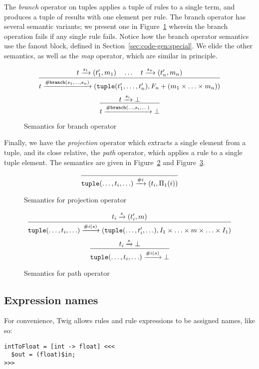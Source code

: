 The \emph{branch} operator on tuples applies a tuple of rules to a single term, and produces a tuple of results with one element per rule. The branch operator has several semantic variants; we present one in Figure~\ref{fig:branch} wherein the branch operation fails if any single rule fails. Notice how the branch operator semantics use the fanout block, defined in Section~\ref{sec:code-gen:special}. We elide the other semantics, as well as the \emph{map} operator, which are similar in principle.

\begin{figure}[ht]
\label{fig:branch}
\[
\infer
  {t \arr{\mathtt{\#branch}(s_1,\ldots,s_n)} (\mathtt{tuple}(t_1',\ldots,t_n'),F_n + (m_1 \times \ldots \times m_n))}
  {t \arr{s_1} (t_1',m_1) \quad \ldots \quad t \arr{s_n} (t_n',m_n)}
\]
\[
\infer
  {t \arr{\mathtt{\#branch}(\ldots,s_i,\dots)} \bot}
  {t \arr{s_i} \bot}
\]
\caption{Semantics for branch operator}
\end{figure}

Finally, we have the \emph{projection} operator which extracts a single element from a tuple, and its close relative, the \emph{path} operator, which applies a rule to a single tuple element. The semantics are given in Figure~\ref{fig:projection} and Figure~\ref{fig:path}.

\begin{figure}[ht]
\label{fig:projection}
\[
\infer
  {\mathtt{tuple}(\ldots,t_i,\ldots) \arr{\#i} (t_i,\Pi_1(i))}
  {}
\]
\caption{Semantics for projection operator}
\end{figure}


\begin{figure}[ht]
\label{fig:path}
\[
\infer
  {\mathtt{tuple}(\ldots,t_i,\ldots) \arr{\#i(s)} (\mathtt{tuple}(\ldots,t_i',\ldots), I_1 \times \ldots \times m \times \ldots \times I_1)}
  {t_i \arr{s} (t_i',m)}
\]
\[
\infer
  {\mathtt{tuple}(\ldots,t_i,\ldots) \arr{\#i(s)} \bot}
  {t_i \arr{s} \bot}
\]
\caption{Semantics for path operator}
\end{figure}

\subsection{Expression names}
\label{section:names}

For convenience, Twig allows rules and rule expressions to be assigned names, like so:

\begin{verbatim}
intToFloat = [int -> float] <<<
  $out = (float)$in;
>>>
\end{verbatim}

